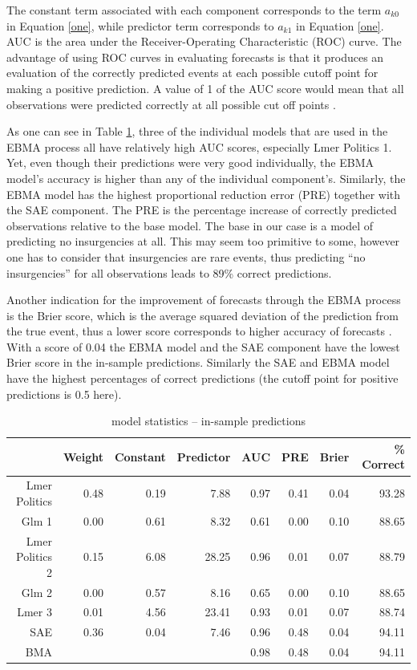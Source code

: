 \documentclass[pdftex,12pt,fullpage,oneside]{amsart}
\begin{document}
The constant term associated with each component corresponds to the term
$a_{k0}$ in Equation \ref{one}, while predictor term corresponds to
$a_{k1}$ in Equation \ref{one}.  AUC is the area under the
Receiver-Operating Characteristic (ROC) curve. The advantage of using
ROC curves in evaluating forecasts is that it produces an evaluation
of the correctly predicted events at each possible cutoff point for
making a positive prediction. A value of 1 of the AUC score would
mean that all observations were predicted correctly at all possible
cut off points \citep{King:Zeng:2001}.  

As one can see in Table \ref{InSam1}, three  of the individual models that
are used in the EBMA process all have relatively high AUC scores,
especially Lmer Politics 1. Yet, even though their
predictions were very good individually, the EBMA model's accuracy is
higher than any of the individual component's.  Similarly, the EBMA model
has the highest proportional reduction error (PRE) together with the
SAE component. The PRE is the percentage increase of correctly predicted
observations relative to the base model. The base in our case is
a model of predicting no insurgencies at all. This may seem too
primitive to some, however one has to consider that insurgencies are
rare events, thus predicting ``no insurgencies'' for all observations
leads to 89\% correct predictions.

Another indication for the improvement of forecasts through the EBMA process
is the Brier score, which is the average squared deviation of the
prediction from the true event, thus a lower score corresponds to
higher accuracy of forecasts \citep{Brier:1950}.  With a score of 0.04
the EBMA model and the SAE component have the lowest Brier score in the
in-sample predictions. Similarly the SAE and EBMA model have the
highest percentages of correct predictions (the cutoff point for
positive predictions is 0.5 here).

\begin{table}[ht]
\begin{center}
\caption{model statistics -- in-sample predictions}\label{InSam1}\begin{tabular}{rrrrrrrr}
  \hline
& Weight & Constant & Predictor & AUC & PRE & Brier & \% Correct
\\
  \hline
Lmer Politics & 0.48 & 0.19 & 7.88 & 0.97 & 0.41 & 0.04 & 93.28
\\
  Glm 1 & 0.00 & 0.61 & 8.32 & 0.61 & 0.00 & 0.10 & 88.65 \\ 
Lmer Politics 2 & 0.15 & 6.08 & 28.25 & 0.96 & 0.01 & 0.07 &
88.79 \\
  Glm 2 & 0.00 & 0.57 & 8.16 & 0.65 & 0.00 & 0.10 & 88.65 \\ 
  Lmer 3 & 0.01 & 4.56 & 23.41 & 0.93 & 0.01 & 0.07 & 88.74 \\ 
  SAE & 0.36 & 0.04 & 7.46 & 0.96 & 0.48 & 0.04 & 94.11 \\ 
  BMA &  &  &  & 0.98 & 0.48 & 0.04 & 94.11 \\ 
   \hline
\end{tabular}
\end{center}
\end{table}
\end{document}
